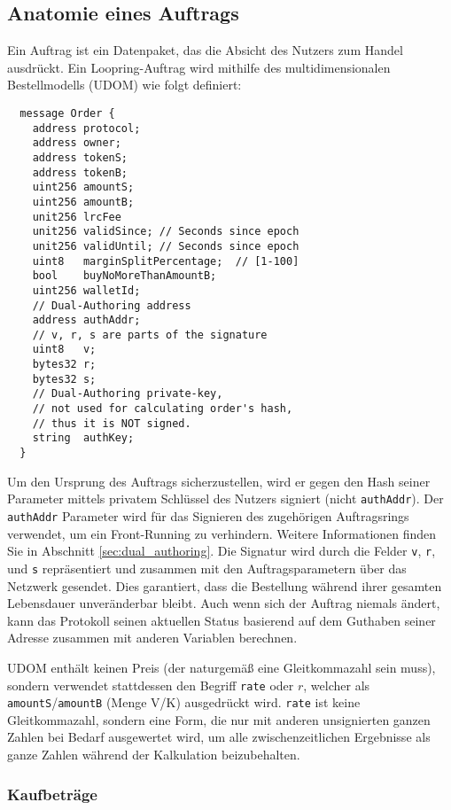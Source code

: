 \documentclass[UTF8,nofonts]{article}
\begin{document}
\begin{multicols}{2}
\subsection{Anatomie eines Auftrags\label{anatomy}}
Ein Auftrag ist ein Datenpaket, das die Absicht des Nutzers zum Handel ausdrückt. Ein Loopring-Auftrag wird mithilfe des multidimensionalen Bestellmodells (UDOM) wie folgt definiert:

\begin{verbatim}
  message Order {
    address protocol;
    address owner;
    address tokenS;
    address tokenB;
    uint256 amountS;
    uint256 amountB;
    unit256 lrcFee
    unit256 validSince; // Seconds since epoch
    unit256 validUntil; // Seconds since epoch
    uint8   marginSplitPercentage;  // [1-100]
    bool    buyNoMoreThanAmountB;
    uint256 walletId;
    // Dual-Authoring address
    address authAddr;
   	// v, r, s are parts of the signature
    uint8   v;       
    bytes32 r;
    bytes32 s;
    // Dual-Authoring private-key,
    // not used for calculating order's hash,
    // thus it is NOT signed.
    string  authKey;          
  }
\end{verbatim}

Um den Ursprung des Auftrags sicherzustellen, wird er gegen den Hash seiner Parameter mittels privatem Schlüssel des Nutzers signiert (nicht \verb|authAddr|). Der \verb|authAddr| Parameter wird für das Signieren des zugehörigen Auftragsrings verwendet, um ein Front-Running zu verhindern. Weitere Informationen finden Sie in Abschnitt \ref{sec:dual_authoring}. Die Signatur wird durch die Felder \verb|v|, \verb|r|, und \verb|s| repräsentiert und zusammen mit den Auftragsparametern über das Netzwerk gesendet. Dies garantiert, dass die Bestellung während ihrer gesamten Lebensdauer unveränderbar bleibt. Auch wenn sich der Auftrag niemals ändert, kann das Protokoll seinen aktuellen Status basierend auf dem Guthaben seiner Adresse zusammen mit anderen Variablen berechnen.

UDOM enthält keinen Preis (der naturgemäß eine Gleitkommazahl sein muss), sondern verwendet stattdessen den Begriff \verb|rate| oder $r$, welcher als \verb|amountS|/\verb|amountB| (Menge V/K) ausgedrückt wird. \verb|rate| ist keine Gleitkommazahl, sondern eine Form, die nur mit anderen unsignierten ganzen Zahlen bei Bedarf ausgewertet wird, um alle zwischenzeitlichen Ergebnisse als ganze Zahlen während der Kalkulation beizubehalten.

\subsubsection{Kaufbeträge}


\end{multicols}
\end{document}

